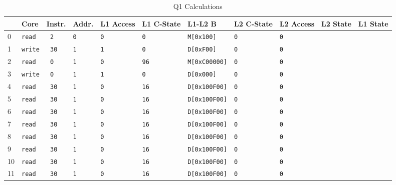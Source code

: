 \documentclass[a4paper,11pt]{article}
\newcommand{\T}{\texttt}
\begin{document}
\begin{sidewaystable}
\caption{Q1 Calculations} \label{tab:q1calc} 
\begin{center}
\begin{tabular}{| l | l | l | l | l | l | l | l | l | l | l |}
\hline
              &   Core     & Instr.        & Addr.  & L1 Access & L1 C-State  & L1-L2 B         &   L2 C-State  & L2 Access & L2 State & L1 State   \\ \hline
 0            &  \T{read}  & \T{ 2}        & \T{0}  & \T{0}     & \T{0}       & \T{M[0x100]}    &      \T{0}    & \T{0}     &          &            \\ \hline
 1            &  \T{write} & \T{ 30}       & \T{1}  & \T{1}     & \T{0}       & \T{D[0xF00]}    &      \T{0}    & \T{0}     &          &            \\ \hline
 2            &  \T{read}  & \T{ 0}        & \T{1}  & \T{0}     & \T{96}      & \T{M[0xC00000]} &      \T{0}    & \T{0}     &          &            \\ \hline
 3            &  \T{write} & \T{ 0}        & \T{1}  & \T{1}     & \T{0}       & \T{D[0x000]}    &      \T{0}    & \T{0}     &          &            \\ \hline
 4            &  \T{read}  & \T{ 30}       & \T{1}  & \T{0}     & \T{16}      & \T{D[0x100F00]} &      \T{0}    & \T{0}     &          &            \\ \hline
 5            &  \T{read}  & \T{ 30}       & \T{1}  & \T{0}     & \T{16}      & \T{D[0x100F00]} &      \T{0}    & \T{0}     &          &            \\ \hline
 6            &  \T{read}  & \T{ 30}       & \T{1}  & \T{0}     & \T{16}      & \T{D[0x100F00]} &      \T{0}    & \T{0}     &          &            \\ \hline
 7            &  \T{read}  & \T{ 30}       & \T{1}  & \T{0}     & \T{16}      & \T{D[0x100F00]} &      \T{0}    & \T{0}     &          &            \\ \hline
 8            &  \T{read}  & \T{ 30}       & \T{1}  & \T{0}     & \T{16}      & \T{D[0x100F00]} &      \T{0}    & \T{0}     &          &            \\ \hline
 9            &  \T{read}  & \T{ 30}       & \T{1}  & \T{0}     & \T{16}      & \T{D[0x100F00]} &      \T{0}    & \T{0}     &          &            \\ \hline
 10           &  \T{read}  & \T{ 30}       & \T{1}  & \T{0}     & \T{16}      & \T{D[0x100F00]} &      \T{0}    & \T{0}     &          &            \\ \hline
 11           &  \T{read}  & \T{ 30}       & \T{1}  & \T{0}     & \T{16}      & \T{D[0x100F00]} &      \T{0}    & \T{0}     &          &            \\ \hline
\end{tabular}
\end{center}
\end{sidewaystable}
\end{document}
